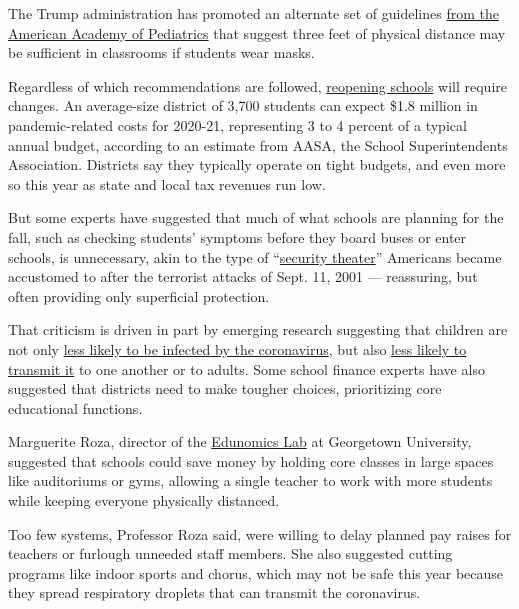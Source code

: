 The Trump administration has promoted an alternate set of guidelines
\href{https://www.nytimes.com/2020/06/30/us/coronavirus-schools-reopening-guidelines-aap.html}{from
the American Academy of Pediatrics} that suggest three feet of physical
distance may be sufficient in classrooms if students wear masks.

Regardless of which recommendations are followed,
\href{https://www.nytimes.com/2020/07/29/magazine/schools-reopening-covid.html}{reopening
schools} will require changes. An average-size district of 3,700
students can expect \$1.8 million in pandemic-related costs for 2020-21,
representing 3 to 4 percent of a typical annual budget, according to an
estimate from AASA, the School Superintendents Association. Districts
say they typically operate on tight budgets, and even more so this year
as state and local tax revenues run low.

But some experts have suggested that much of what schools are planning
for the fall, such as checking students' symptoms before they board
buses or enter schools, is unnecessary, akin to the type of
``\href{https://onezero.medium.com/the-public-is-being-misled-by-pandemic-technology-that-wont-keep-them-safe-1966ed740a87}{security
theater}'' Americans became accustomed to after the terrorist attacks of
Sept. 11, 2001 --- reassuring, but often providing only superficial
protection.

That criticism is driven in part by emerging research suggesting that
children are not only
\href{https://pubmed.ncbi.nlm.nih.gov/32546824/}{less likely to be
infected by the coronavirus}, but also
\href{https://pediatrics.aappublications.org/content/early/2020/05/22/peds.2020-004879}{less
likely to transmit it} to one another or to adults. Some school finance
experts have also suggested that districts need to make tougher choices,
prioritizing core educational functions.

Marguerite Roza, director of the
\href{https://edunomicslab.org/}{Edunomics Lab} at Georgetown
University, suggested that schools could save money by holding core
classes in large spaces like auditoriums or gyms, allowing a single
teacher to work with more students while keeping everyone physically
distanced.

Too few systems, Professor Roza said, were willing to delay planned pay
raises for teachers or furlough unneeded staff members. She also
suggested cutting programs like indoor sports and chorus, which may not
be safe this year because they spread respiratory droplets that can
transmit the coronavirus.


